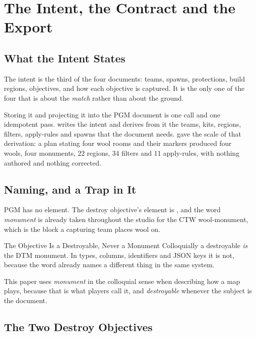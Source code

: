 \chapter{The Intent, the Contract and the Export}
\label{ch:export}

\section{What the Intent States}

The intent is the third of the four documents: teams, spawns, protections, build
regions, objectives, and how each objective is captured. It is the only one of the
four that is about the \emph{match} rather than about the ground.

Storing it and projecting it into the PGM document is one call and one idempotent
pass.  writes the intent and derives from it the
teams, kits, regions, filters, apply-rules and spawns that the document needs.
 gave the scale of that derivation: a plan stating four wool rooms
and their markers produced four wools, four monuments, 22 regions, 34 filters and 11
apply-rules, with nothing authored and nothing corrected.

\section{Naming, and a Trap in It}

PGM has no  element. The destroy objective's element is
, and the word \emph{monument} is already taken throughout the
studio for the CTW wool-monument, which is the block a capturing team places wool
on.

\begin{ruling}{The Objective Is a Destroyable, Never a Monument}
Colloquially a destroyable \emph{is} the DTM monument. In types, columns,
identifiers and JSON keys it is not, because the word already names a different
thing in the same system.
\end{ruling}

This paper uses \emph{monument} in the colloquial sense when describing how a map
plays, because that is what players call it, and \emph{destroyable} whenever the
subject is the document.

\section{The Two Destroy Objectives}

